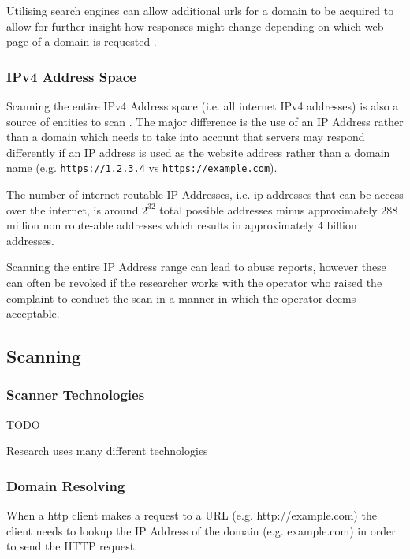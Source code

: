 \documentclass{mscreport}
\begin{document}
Utilising search engines can allow additional urls for a domain to be acquired to allow for further insight how responses might change depending on which web page of a domain is requested \cite{Chen2016-dl}.

\subsubsection{IPv4 Address Space}

Scanning the entire IPv4 Address space (i.e. all internet  IPv4 addresses) is also a source of entities to scan \cite{Kotzias2018-wd}. The major difference is the use of an IP Address rather than a domain which needs to take into account that servers may respond differently if an IP address is used as the website address rather than a domain name (e.g. \texttt{https://1.2.3.4} vs \texttt{https://example.com}).

\vspace{0.3cm} \noindent
The number of internet routable IP Addresses, i.e. ip addresses that can be access over the internet, is around \(2^{32}\) total possible addresses minus approximately 288 million non route-able addresses which results in approximately 4 billion addresses.

\vspace{0.3cm} \noindent
Scanning the entire IP Address range can lead to abuse reports, however these can often be revoked if the researcher works with the operator who raised the complaint to conduct the scan in a manner in which the operator deems acceptable.

\subsection{Scanning}


\subsubsection{Scanner Technologies}

TODO

Research uses many different technologies

\subsubsection{Domain Resolving}

When a http client makes a request to a URL (e.g. http://example.com) the client needs to lookup the IP Address of the domain (e.g. example.com) in order to send the HTTP request.
\end{document}
